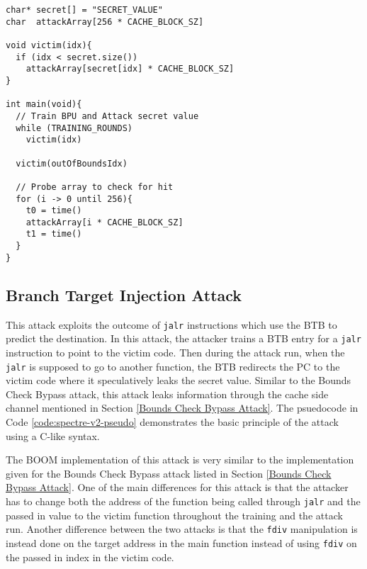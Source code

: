 \begin{lstlisting}[style=column-code, label={code:spectre-v1-pseudo}, caption=Psuedocode of Bounds Check Bypass Attack]
char* secret[] = "SECRET_VALUE"
char  attackArray[256 * CACHE_BLOCK_SZ]

void victim(idx){
  if (idx < secret.size())
    attackArray[secret[idx] * CACHE_BLOCK_SZ]
}

int main(void){
  // Train BPU and Attack secret value
  while (TRAINING_ROUNDS)
    victim(idx)

  victim(outOfBoundsIdx)

  // Probe array to check for hit
  for (i -> 0 until 256){
    t0 = time()
    attackArray[i * CACHE_BLOCK_SZ]
    t1 = time()
  }
}
\end{lstlisting}

\subsection{Branch Target Injection Attack}

This attack exploits the outcome
of {\tt jalr} instructions which use the BTB to predict the destination. In this attack,
the attacker trains a BTB entry for a {\tt jalr} instruction to point to 
the victim code. Then during the attack run, when the {\tt jalr} is supposed to go to another function,
the BTB redirects the PC to the victim code where it speculatively leaks the secret value. Similar to the
Bounds Check Bypass attack, this attack leaks information through the
cache side channel mentioned in Section \ref{Bounds Check Bypass Attack}. The psuedocode in 
Code \ref{code:spectre-v2-pseudo} demonstrates the basic principle of the attack using a C-like syntax.

The BOOM implementation of this attack is very similar to the implementation given for
the Bounds Check Bypass attack listed in Section \ref{Bounds Check Bypass Attack}. One of the main differences
for this attack is that the attacker has to change both the address of the function being called through
{\tt jalr} and the passed in value to the victim function throughout the training and the attack run.
Another difference between the two attacks is that the {\tt fdiv} manipulation is instead done on the target address
in the main function instead of using {\tt fdiv} on the passed in index in the victim code.

